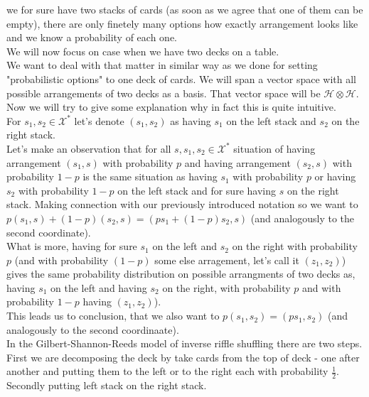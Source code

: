 \documentclass[a4paper, 12pt]{report}
\begin{document}
we for sure have two stacks of cards (as soon as we agree that one of them can be empty),
there are only finetely many options how exactly arrangement looks like and we know a probability of each
one.
\\ We will now focus on case when we have two decks on a table. \\
We want to deal with that matter in similar way as we done for setting "probabilistic options" to one deck
of cards. We will span a vector space with all possible arrangements of two decks as a basis.
That vector space will be $\mathcal{H} \otimes \mathcal{H}$. Now we will try to give some explanation why in
fact this is quite intuitive.  \\
For $s_1, s_2 \in \mathcal{X}^*$ let's denote $(s_1, s_2)$ as having $s_1$ on the left stack and $s_2$
on the right stack. \\
Let's make an observation that for all $s, s_1, s_2 \in \mathcal{X}^*$ situation of having arrangement
$(s_1, s)$ with probability $p$ and having arrangement $(s_2, s)$ with probability $1-p$ is
the same situation as having $s_1$ with probability $p$ or having $s_2$ with probability $1 - p$ on the left
stack and for sure having $s$ on the right stack. Making connection with our previously introduced notation
so we want to $p(s_1, s) + (1-p)(s_2, s) = (ps_1 + (1-p)s_2, s)$ (and analogously to the second
coordinate).\\
What is more, having for sure $s_1$ on the left and $s_2$ on the right with probability $p$ (and
with probability $(1 - p)$ some else arragement, let's call it $(z_1, z_2)$) gives the same probability
distribution
on possible arrangments of two decks as, having $s_1$ on the left and having $s_2$ on the
right, with probability $p$ and with probability $1-p$ having $(z_1,z_2)$).\\
This leads us to conclusion, that we also want to $p(s_1,s_2) = (ps_1, s_2)$ (and analogously to the second
coordinaate). \\
In the Gilbert-Shannon-Reeds model of inverse riffle shuffling there are two steps. First we are
decomposing the deck by take cards from the top of deck - one after another and putting them to the left
or to the right each with probability $\frac{1}{2}$. Secondly putting left stack on the right stack. \\
\end{document}
